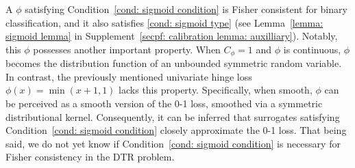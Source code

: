\documentclass[preprint] {imsart}
\begin{document}
{\color{black} A\label{page: distributional presentration} $\phi$ satisfying  Condition~\ref{cond: sigmoid  condition} is Fisher consistent for binary classification, and it also satisfies  \eqref{cond: sigmoid type} (see  Lemma~\ref{lemma: sigmoid lemma} in Supplement~\ref{secpf: calibration lemma: auxilliary}). 
Notably, this $\phi$ possesses another important property.  When $C_\phi=1$ and $\phi$ is continuous, $\phi$ becomes the distribution function of an unbounded symmetric random variable. In contrast, the previously mentioned univariate hinge loss $\phi(x)=\min(x+1,1)$ lacks this property. Specifically, when smooth, $\phi$ can be perceived as a smooth version of the 0-1 loss, smoothed via a symmetric distributional kernel. Consequently, it can be inferred that surrogates satisfying Condition~\ref{cond: sigmoid condition} closely approximate the 0-1 loss.   That being said, we do not yet know if Condition~\ref{cond: sigmoid condition} is necessary for Fisher consistency in the DTR problem. }



\end{document}
